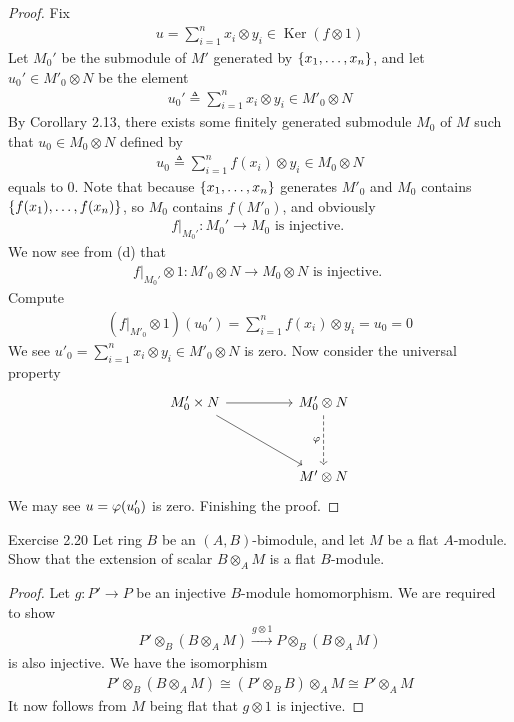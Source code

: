 \documentclass{report}
\begin{document}
\begin{proof}
Fix 
\begin{align*}
u = \sum_{i=1}^n x_i \otimes  y_i \in \operatorname{Ker}(f\otimes  1)
\end{align*}
Let $M_0'$ be the submodule of $M'$ generated by $\{ x_1,\dots ,x_n \}$, and let $u_0' \in M'_0\otimes  N$ be the element 
\begin{align*}
u_0'\triangleq \sum_{i=1}^n x_i \otimes  y_i \in M'_0 \otimes  N
\end{align*}
By Corollary 2.13, there exists some finitely generated submodule $M_0$ of  $M$ such that $u_0 \in M_0\otimes N$ defined by
 \begin{align*}
u_0\triangleq \sum_{i=1}^n f(x_i) \otimes y_i \in M_0 \otimes  N
\end{align*}
equals to $0$. Note that because $\{ x_1,\dots ,x_n \}$ generates $M'_0$ and  $M_0$ contains $\{ f(x_1),\dots ,f(x_n) \}$, so $M_0$  contains $f(M'_0)$, and obviously 
\begin{align*}
f|_{M_0'}:M_0'\rightarrow M_0\text{ is injective. }
\end{align*}
We now see from (d) that 
\begin{align*}
f|_{M_0'}\otimes 1:M'_0 \otimes  N\rightarrow M_0 \otimes  N\text{ is injective. }
\end{align*}
Compute 
\begin{align*}
  (f|_{M'_0}\otimes  1)(u_0')= \sum_{i=1}^n f(x_i)\otimes  y_i=u_0=0
\end{align*}
We see $u'_0=\sum_{i=1}^n x_i \otimes  y_i \in M'_0 \otimes  N$ is zero. Now consider  the universal property 
\[\begin{tikzcd}
	{M'_0 \times N } && {M'_0 \otimes N} \\
	\\
	&& {M' \otimes N}
	\arrow[from=1-1, to=1-3]
	\arrow[from=1-1, to=3-3]
	\arrow["\pfi"', dashed, from=1-3, to=3-3]
\end{tikzcd}\]
We may see $u=\pfi(u_0')$ is zero. Finishing the proof. 
\end{proof}
\begin{question}{Exercise 2.20}{}
Let ring $B$ be an  $(A,B)$-bimodule, and let $M$ be a flat  $A$-module. Show that the extension of scalar $B\otimes_A M$ is a flat $B$-module. 
\end{question}
\begin{proof}
Let $g:P'\rightarrow P$ be an injective $B$-module homomorphism.  We are required to show 
\begin{align*}
P' \otimes_B (B \otimes _A M) \overset{g\otimes 1}{\longrightarrow } P \otimes  _B (B \otimes_A M)
\end{align*}
is also injective. We have the isomorphism 
\begin{align*}
P' \otimes  _B (B\otimes  _A M) \cong  (P' \otimes  _B B) \otimes_A M \cong  P' \otimes _A M 
\end{align*}
It now follows from $M$ being flat that  $g\otimes  1$ is injective. 


\end{proof}
\end{document}
